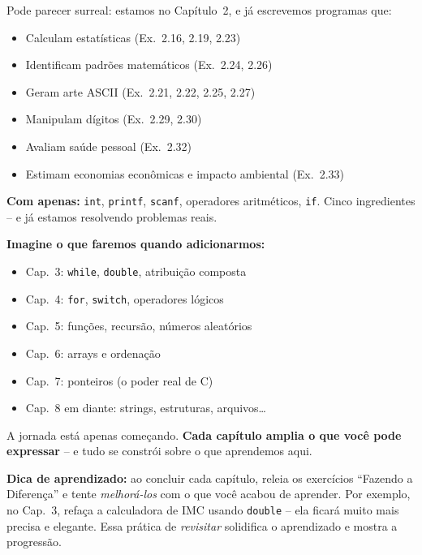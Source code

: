 \documentclass[12pt,a4paper]{article}
\begin{document}
\begin{tcolorbox}[colback=deitellightblue,colframe=deitelblue,
  title={\bfseries Os primeiros programas que importam}]

Pode parecer surreal: estamos no Capítulo~2, e já escrevemos programas que:

\begin{itemize}[noitemsep]
  \item Calculam estatísticas (Ex.\ 2.16, 2.19, 2.23)
  \item Identificam padrões matemáticos (Ex.\ 2.24, 2.26)
  \item Geram arte ASCII (Ex.\ 2.21, 2.22, 2.25, 2.27)
  \item Manipulam dígitos (Ex.\ 2.29, 2.30)
  \item Avaliam saúde pessoal (Ex.\ 2.32)
  \item Estimam economias econômicas e impacto ambiental (Ex.\ 2.33)
\end{itemize}

\textbf{Com apenas:} \texttt{int}, \texttt{printf}, \texttt{scanf}, operadores
aritméticos, \texttt{if}. Cinco ingredientes -- e já estamos resolvendo problemas
reais.

\textbf{Imagine o que faremos quando adicionarmos:}
\begin{itemize}[noitemsep]
  \item Cap.~3: \texttt{while}, \texttt{double}, atribuição composta
  \item Cap.~4: \texttt{for}, \texttt{switch}, operadores lógicos
  \item Cap.~5: funções, recursão, números aleatórios
  \item Cap.~6: arrays e ordenação
  \item Cap.~7: ponteiros (o poder real de C)
  \item Cap.~8 em diante: strings, estruturas, arquivos\ldots
\end{itemize}

A jornada está apenas começando. \textbf{Cada capítulo amplia o que você pode
expressar} -- e tudo se constrói sobre o que aprendemos aqui.

\end{tcolorbox}

\begin{boaprática}
  \textbf{Dica de aprendizado:} ao concluir cada capítulo, releia os exercícios
  ``Fazendo a Diferença'' e tente \textit{melhorá-los} com o que você acabou de
  aprender. Por exemplo, no Cap.~3, refaça a calculadora de IMC usando
  \texttt{double} -- ela ficará muito mais precisa e elegante. Essa prática de
  \textit{revisitar} solidifica o aprendizado e mostra a progressão.
\end{boaprática}
\end{document}
